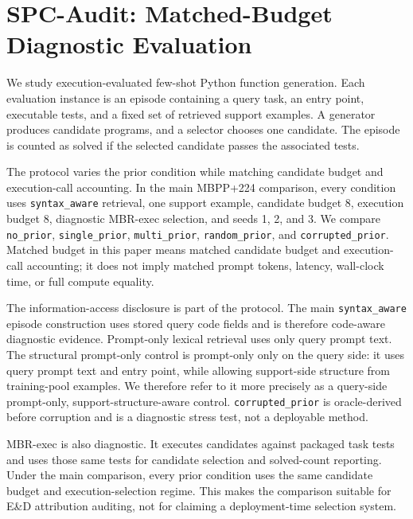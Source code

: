 \documentclass{article}
\begin{document}
\section{SPC-Audit: Matched-Budget Diagnostic Evaluation}
We study execution-evaluated few-shot Python function generation. Each evaluation instance is an episode containing a query task, an entry point, executable tests, and a fixed set of retrieved support examples. A generator produces candidate programs, and a selector chooses one candidate. The episode is counted as solved if the selected candidate passes the associated tests.

The protocol varies the prior condition while matching candidate budget and execution-call accounting. In the main MBPP+224 comparison, every condition uses \texttt{syntax\_aware} retrieval, one support example, candidate budget 8, execution budget 8, diagnostic MBR-exec selection, and seeds 1, 2, and 3. We compare \texttt{no\_prior}, \texttt{single\_prior}, \texttt{multi\_prior}, \texttt{random\_prior}, and \texttt{corrupted\_prior}. Matched budget in this paper means matched candidate budget and execution-call accounting; it does not imply matched prompt tokens, latency, wall-clock time, or full compute equality.

The information-access disclosure is part of the protocol. The main \texttt{syntax\_aware} episode construction uses stored query code fields and is therefore code-aware diagnostic evidence. Prompt-only lexical retrieval uses only query prompt text. The structural prompt-only control is prompt-only only on the query side: it uses query prompt text and entry point, while allowing support-side structure from training-pool examples. We therefore refer to it more precisely as a query-side prompt-only, support-structure-aware control. \texttt{corrupted\_prior} is oracle-derived before corruption and is a diagnostic stress test, not a deployable method.

MBR-exec is also diagnostic. It executes candidates against packaged task tests and uses those same tests for candidate selection and solved-count reporting. Under the main comparison, every prior condition uses the same candidate budget and execution-selection regime. This makes the comparison suitable for E\&D attribution auditing, not for claiming a deployment-time selection system.
\end{document}

